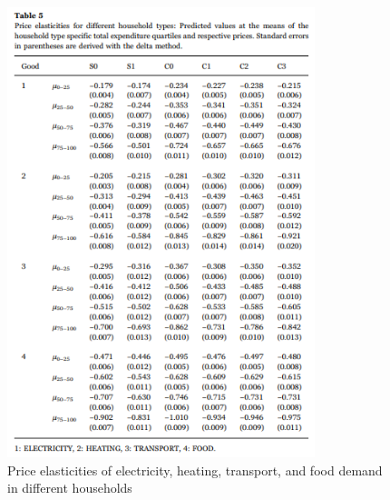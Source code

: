 \begin{figure}[h]  %
	\centering
	\includegraphics[width=0.8\textwidth]{./figure/ch2/fig2.5_table5.png}
	\caption{Price elasticities of electricity, heating, transport, and food demand in different households}\label{fig2.5}
\end{figure}




